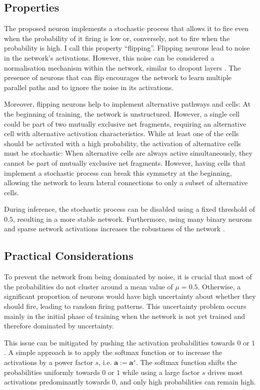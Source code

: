 \subsection{Properties}
The proposed neuron implements a stochastic process that allows it to fire even when the probability of it firing is low or, conversely, not to fire when the probability is high.
I call this property ``flipping''.
Flipping neurons lead to noise in the network's activations.
However, this noise can be considered a normalisation mechanism within the network, similar to dropout layers .
The presence of neurons that can flip encourages the network to learn multiple parallel paths and to ignore the noise in its activations.

Moreover, flipping neurons help to implement alternative pathways and cells: At the beginning of training, the network is unstructured.
However, a single cell could be part of two mutually exclusive net fragments, requiring an alternative cell with alternative activation characteristics.
While at least one of the cells should be activated with a high probability, the activation of alternative cells must be stochastic:
When alternative cells are always active simultaneously, they cannot be part of mutually exclusive net fragments.
However, having cells that implement a stochastic process can break this symmetry at the beginning, allowing the network to learn lateral connections to only a subset of alternative cells.

During inference, the stochastic process can be disabled using a fixed threshold of $0.5$, resulting in a more stable network.
Furthermore, using many binary neurons and sparse network activations increases the robustness of the network .


\subsection{Practical Considerations}
To prevent the network from being dominated by noise, it is crucial that most of the probabilities do not cluster around a mean value of $\mu = 0.5$. Otherwise, a significant proportion of neurons would have high uncertainty about whether they should fire, leading to random firing patterns. This uncertainty problem occurs mainly in the initial phase of training when the network is not yet trained and therefore dominated by uncertainty.

This issue can be mitigated by pushing the activation probabilities towards $0$ or $1$. A simple approach is to apply the softmax function or to increase the activations by a power factor $s$, i.e. $\boldsymbol{a} := \boldsymbol{a}^s$. The softmax function shifts the probabilities uniformly towards $0$ or $1$ while using a large factor $s$ drives most activations predominantly towards $0$, and only high probabilities can remain high.

